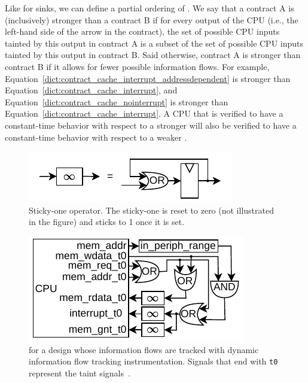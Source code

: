 Like for sinks, we can define a partial ordering of \pics.
We say that a contract A is (inclusively) stronger than a contract B if for every output of the CPU (i.e., the left-hand side of the arrow in the contract), the set of possible CPU inputs tainted by this output in contract A is a subset of the set of possible CPU inputs tainted by this output in contract B.
Said otherwise, contract A is stronger than contract B if it allows for fewer possible information flows.
For example, Equation~\ref{dict:contract_cache_interrupt_addressdependent} is stronger than Equation~\ref{dict:contract_cache_interrupt}, and Equation~\ref{dict:contract_cache_nointerrupt} is stronger than Equation~\ref{dict:contract_cache_interrupt}.
A CPU that is verified to have a constant-time behavior with respect to a stronger \pic will also be verified to have a constant-time behavior with respect to a weaker \pic.

\begin{figure}
    \begin{center}
    \includegraphics[width=.9\columnwidth]{figures/stickyone/stickyone.pdf}
    \end{center}
    \vspace*{-1em}
    \caption{Sticky-one operator. The sticky-one is reset to zero (not illustrated in the figure) and sticks to 1 once it is set.}
    \label{fig:stickyone}
    \vspace*{-.4em}
\end{figure}


\begin{figure}
    \begin{center}
    \includegraphics[width=.9\columnwidth]{figures/picinstrum_taints/picinstrum_taints.pdf}
    \end{center}
    \vspace*{-1em}
    \caption{\Pici for a design whose information flows are tracked with dynamic information flow tracking instrumentation. Signals that end with \texttt{t0} represent the taint signals~\cite{tiwari2009complete,solt2022cellift}.
    }
    \label{fig:pic_instrum_taints}
    \vspace*{-.4em}
\end{figure}

